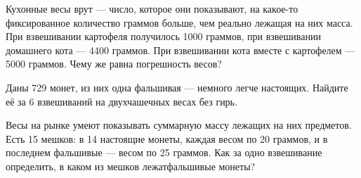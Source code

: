 ﻿

\begin{enumerate}
\itA Кухонные весы врут — число, которое они показывают, на какое-то фиксированное количество граммов больше, чем реально лежащая на них масса. При взвешивании картофеля получилось 1000 граммов, при взвешивании домашнего кота — 4400 граммов. При взвешивании кота вместе с картофелем — 5000 граммов. Чему же равна погрешность весов?

\itB Даны 729 монет, из них одна фальшивая — немного легче настоящих. Найдите её за 6 взвешиваний на двухчашечных весах без гирь.

\itC Весы на рынке умеют показывать суммарную массу лежащих на них предметов. Есть 15 мешков: в 14 настоящие монеты, каждая весом по 20 граммов, и в последнем фальшивые — весом по 25 граммов. Как за одно взвешивание определить, в каком из мешков лежат\linebreak фальшивые монеты?
\end{enumerate}
